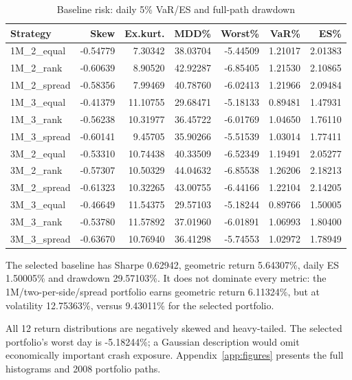 \documentclass[10pt,letterpaper]{article}
\newcommand{\rBaseSharpe}{0.62942}
\newcommand{\rBaseGeom}{5.64307}
\newcommand{\rBaseVol}{9.43011}
\newcommand{\rBaseDD}{29.57103}
\newcommand{\rBaseES}{1.50005}
\newcommand{\rBaseWorst}{-5.18244}
\newcommand{\rSpreadGeom}{6.11324}
\newcommand{\rSpreadVol}{12.75363}
\begin{document}
\begin{table}[H]\centering\small\caption{Baseline risk: daily 5\% VaR/ES and full-path drawdown}
\begin{tabular}{lrrrrrr}\toprule
Strategy & Skew & Ex.kurt. & MDD\% & Worst\% & VaR\% & ES\%\\\midrule
1M\_2\_equal & -0.54779 & 7.30342 & 38.03704 & -5.44509 & 1.21017 & 2.01383\\
1M\_2\_rank & -0.60639 & 8.90520 & 42.92287 & -6.85405 & 1.21530 & 2.10865\\
1M\_2\_spread & -0.58356 & 7.99469 & 40.78760 & -6.02413 & 1.21966 & 2.09484\\
1M\_3\_equal & -0.41379 & 11.10755 & 29.68471 & -5.18133 & 0.89481 & 1.47931\\
1M\_3\_rank & -0.56238 & 10.31977 & 36.45722 & -6.01769 & 1.04650 & 1.76110\\
1M\_3\_spread & -0.60141 & 9.45705 & 35.90266 & -5.51539 & 1.03014 & 1.77411\\
3M\_2\_equal & -0.53310 & 10.74438 & 40.33509 & -6.52349 & 1.19491 & 2.05277\\
3M\_2\_rank & -0.57307 & 10.50329 & 44.04632 & -6.85538 & 1.26206 & 2.18213\\
3M\_2\_spread & -0.61323 & 10.32265 & 43.00755 & -6.44166 & 1.22104 & 2.14205\\
3M\_3\_equal & -0.46649 & 11.54375 & 29.57103 & -5.18244 & 0.89766 & 1.50005\\
3M\_3\_rank & -0.53780 & 11.57892 & 37.01960 & -6.01891 & 1.06993 & 1.80400\\
3M\_3\_spread & -0.63670 & 10.76940 & 36.41298 & -5.74553 & 1.02972 & 1.78949\\
\bottomrule\end{tabular}\end{table}

The selected baseline has Sharpe \rBaseSharpe{}, geometric return \rBaseGeom{}\%, daily ES
\rBaseES{}\% and drawdown \rBaseDD{}\%. It does not dominate every metric: the
1M/two-per-side/spread portfolio earns geometric return \rSpreadGeom{}\%, but at volatility
\rSpreadVol{}\%, versus \rBaseVol{}\% for the selected portfolio.

All 12 return distributions are negatively skewed and heavy-tailed. The selected portfolio's
worst day is \rBaseWorst{}\%; a Gaussian description would omit economically important crash
exposure. Appendix~\ref{app:figures} presents the full histograms and 2008 portfolio paths.
\newpage
\end{document}
